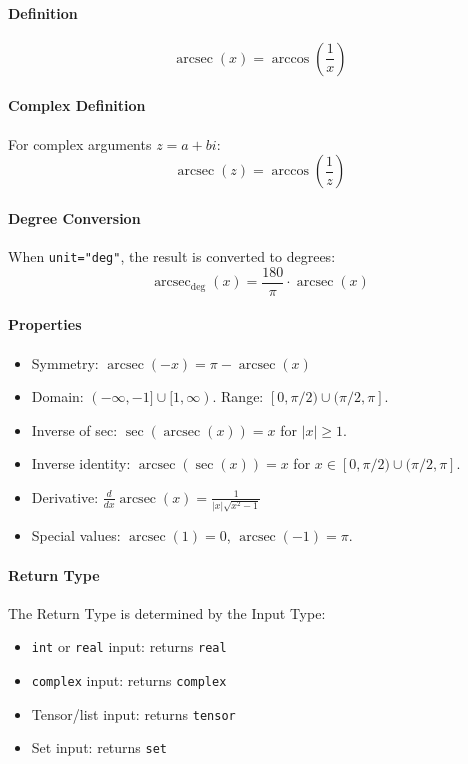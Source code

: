 \paragraph{Definition}
\[
\operatorname{arcsec}(x) = \arccos\left(\frac{1}{x}\right)
\]

\paragraph{Complex Definition}
For complex arguments $z = a + bi$:
\[
\operatorname{arcsec}(z) = \arccos\left(\frac{1}{z}\right)
\]

\paragraph{Degree Conversion}
When \texttt{unit="deg"}, the result is converted to degrees:
\[
\operatorname{arcsec}_{\text{deg}}(x) = \frac{180}{\pi} \cdot \operatorname{arcsec}(x)
\]

\paragraph{Properties}
\begin{itemize}
\item Symmetry: $\operatorname{arcsec}(-x) = \pi - \operatorname{arcsec}(x)$
\item Domain: $(-\infty, -1] \cup [1, \infty)$. Range: $[0, \pi/2) \cup (\pi/2, \pi]$.
\item Inverse of sec: $\sec(\operatorname{arcsec}(x)) = x$ for $|x| \geq 1$.
\item Inverse identity: $\operatorname{arcsec}(\sec(x)) = x$ for $x \in [0, \pi/2) \cup (\pi/2, \pi]$.
\item Derivative: $\frac{d}{dx}\operatorname{arcsec}(x) = \frac{1}{|x|\sqrt{x^2 - 1}}$
\item Special values: $\operatorname{arcsec}(1) = 0$, $\operatorname{arcsec}(-1) = \pi$.
\end{itemize}

\paragraph{Return Type}
The Return Type is determined by the Input Type:
\begin{itemize}
\item \texttt{int} or \texttt{real} input: returns \texttt{real}
\item \texttt{complex} input: returns \texttt{complex}
\item Tensor/list input: returns \texttt{tensor}
\item Set input: returns \texttt{set}
\end{itemize}

